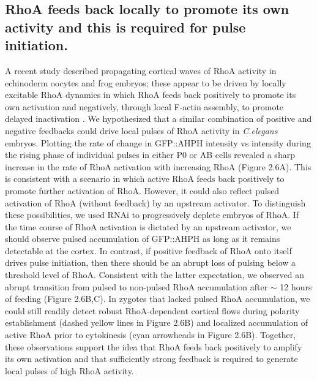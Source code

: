 \documentclass{ucetd}
\begin{document}
\subsection{RhoA feeds back locally to promote its own activity and this is required for pulse initiation.}
A recent study described propagating cortical waves of RhoA activity in echinoderm oocytes and frog embryos; these appear to be driven by locally excitable RhoA dynamics in which RhoA feeds back positively to promote its own activation and negatively, through local F-actin assembly, to promote delayed inactivation \cite{Bement:2015jp}.  We hypothesized that a similar combination of positive and negative feedbacks could drive local pulses of RhoA activity in \textit{C.elegans} embryos.  Plotting the rate of change in GFP::AHPH intensity vs intensity during the rising phase of individual pulses in either P0 or AB cells revealed a sharp increase in the rate of RhoA activation with increasing RhoA (Figure 2.6A). This is consistent with a scenario in which active RhoA feeds back positively to promote further activation of RhoA.  However, it could also reflect pulsed activation of RhoA (without feedback) by an upstream activator.  To distinguish these possibilities, we used RNAi to progressively deplete embryos of RhoA. If the time course of RhoA activation is dictated by an upstream activator, we should observe pulsed accumulation of GFP::AHPH as long as it remains detectable at the cortex. In contrast, if positive feedback of RhoA onto itself drives pulse initiation, then there should be an abrupt loss of pulsing below a threshold level of RhoA.  Consistent with the latter expectation, we observed an abrupt transition from pulsed to non-pulsed RhoA accumulation after $\sim$ 12 hours of feeding (Figure 2.6B,C).  In zygotes that lacked pulsed RhoA accumulation, we could still readily detect robust RhoA-dependent cortical flows \cite{Motegi:2006hi, Schonegg:2006ed} during polarity establishment (dashed yellow lines in Figure 2.6B) and localized accumulation of active RhoA prior to cytokinesis (cyan arrowheads in Figure 2.6B).  Together, these observations support the idea that RhoA feeds back positively to amplify its own activation and that sufficiently strong feedback is required to generate local pulses of high RhoA activity. 
\end{document}
